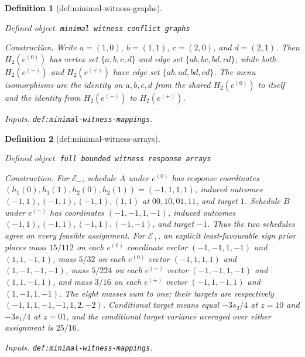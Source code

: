\documentclass{article}
\newtheorem{definition}{Definition}
\begin{document}
\begin{definition}[def:minimal-witness-graphs]\label{def:minimal-witness-graphs}
\par\smallskip\noindent\emph{Defined object.} \texttt{minimal witness conflict graphs}
\par\smallskip\noindent\emph{Construction.} Write \(a=(1,0)\), \(b=(1,1)\), \(c=(2,0)\), and \(d=(2,1)\). Then \(H_2(e^{(0)})\) has vertex set \(\{a,b,c,d\}\) and edge set \(\{ab,bc,bd,cd\}\), while both \(H_2(e^{(-)})\) and \(H_2(e^{(+)})\) have edge set \(\{ab,ad,bd,cd\}\). The menu isomorphisms are the identity on \(a,b,c,d\) from the shared \(H_2(e^{(0)})\) to itself and the identity from \(H_2(e^{(-)})\) to \(H_2(e^{(+)})\).
\par\smallskip\noindent\emph{Inputs.} \texttt{def:\allowbreak{}minimal-\allowbreak{}witness-\allowbreak{}mappings}.
\end{definition}

\begin{definition}[def:minimal-witness-arrays]\label{def:minimal-witness-arrays}
\par\smallskip\noindent\emph{Defined object.} \texttt{full bounded witness response arrays}
\par\smallskip\noindent\emph{Construction.} For \(\mathcal E_-\), schedule \(A\) under \(e^{(0)}\) has response coordinates \((h_{1}(0),h_{1}(1),h_{2}(0),h_{2}(1))=(-1,1,1,1)\), induced outcomes \((-1,1),(-1,1),(-1,1),(1,1)\) at \(00,10,01,11\), and target \(1\). Schedule \(B\) under \(e^{(-)}\) has coordinates \((-1,-1,1,-1)\), induced outcomes \((-1,1),(-1,1),(-1,1),(-1,-1)\), and target \(-1\). Thus the two schedules agree on every feasible assignment. For \(\mathcal E_+\), an explicit least-favourable sign prior places mass \(15/112\) on each \(e^{(0)}\) coordinate vector \((-1,-1,1,-1)\) and \((1,1,-1,1)\), mass \(5/32\) on each \(e^{(0)}\) vector \((-1,1,1,1)\) and \((1,-1,-1,-1)\), mass \(5/224\) on each \(e^{(+)}\) vector \((-1,-1,1,-1)\) and \((1,1,-1,1)\), and mass \(3/16\) on each \(e^{(+)}\) vector \((-1,1,-1,1)\) and \((1,-1,1,-1)\). The eight masses sum to one; their targets are respectively \((-1,1,1,-1,-1,1,2,-2)\). Conditional target means equal \(-3s_2/4\) at \(z=10\) and \(-3s_1/4\) at \(z=01\), and the conditional target variance averaged over either assignment is \(25/16\).
\par\smallskip\noindent\emph{Inputs.} \texttt{def:\allowbreak{}minimal-\allowbreak{}witness-\allowbreak{}mappings}.
\end{definition}
\end{document}
